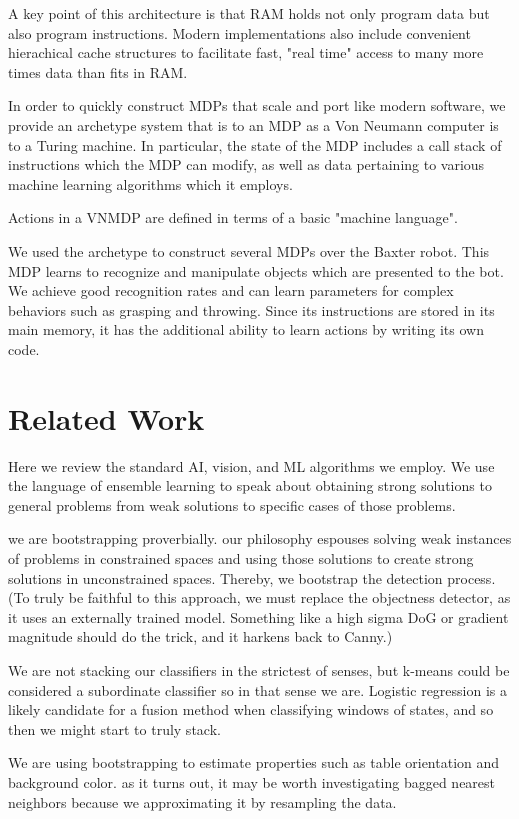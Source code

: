 \documentclass[conference]{IEEEtran}
\begin{document}
A key point of this architecture is that RAM holds not only program data but also program instructions.
Modern implementations also include convenient hierachical cache structures to facilitate fast,
"real time" access to many more times data than fits in RAM.

In order to quickly construct MDPs that scale and port like modern software, we provide an
archetype system that is to an MDP as a Von Neumann computer is to a Turing machine.
In particular, the state of the MDP includes a call stack of instructions which the MDP
can modify, as well as data pertaining to various machine learning algorithms which it employs.

Actions in a VNMDP are defined in terms of a basic "machine language".

We used the archetype to construct several MDPs over the Baxter robot. This MDP learns to recognize and manipulate
objects which are presented to the bot. We achieve good recognition rates and can learn parameters 
for complex behaviors such as grasping and throwing. Since its instructions are stored in its main memory, 
it has the additional ability to learn actions by writing its own code.



\section{Related Work}
Here we review the standard AI, vision, and ML algorithms we employ.
We use the language of ensemble learning to speak about obtaining strong solutions to 
general problems from weak solutions to specific cases of those problems. 

we are bootstrapping proverbially. our philosophy espouses solving weak instances of 
problems in constrained spaces and using those solutions to create strong solutions 
in unconstrained spaces.  Thereby, we bootstrap the detection process. (To truly be 
faithful to this approach, we must replace the objectness detector, as it uses an 
externally trained model. Something like a high sigma DoG or gradient magnitude should 
do the trick, and it harkens back to Canny.)  

We are not stacking our classifiers in the strictest of senses, but k-means could be 
considered a subordinate classifier so in that sense we are.  Logistic regression is 
a likely candidate for a fusion method when classifying windows of states, and so then 
we might start to truly stack.

We are using bootstrapping to estimate properties such as table orientation and background 
color. as it turns out, it may be worth investigating bagged nearest neighbors because 
we approximating it by resampling the data.
\end{document}
